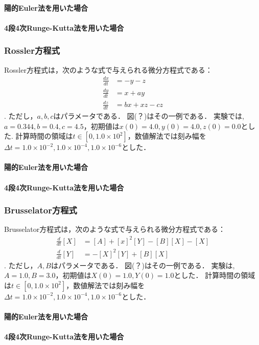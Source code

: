 \paragraph*{陽的Euler法を用いた場合}

\paragraph*{4段4次Runge-Kutta法を用いた場合}

\subsubsection{Rossler方程式}
Rossler方程式は，次のような式で与えられる微分方程式である：
\begin{align}
    \frac{dx}{dt} &= -y-z \\
    \frac{dy}{dt} &= x+ay \\
    \frac{dz}{dt} &= bx + xz - cz
\end{align}.
ただし，$a,b,c$はパラメータである．
図(？)はその一例である．
実験では,$a=0.344, b=0.4, c=4.5$，初期値は$x(0) = 4.0, y(0) = 4.0, z(0) = 0.0$とした.
計算時間の領域は$t \in [0,1.0 \times 10^2]$，数値解法では刻み幅を$\Delta t =  1.0 \times 10^{-2},1.0 \times 10^{-4}, 1.0 \times 10^{-6}$とした．
\paragraph*{陽的Euler法を用いた場合}

\paragraph*{4段4次Runge-Kutta法を用いた場合}

\subsubsection{Brusselator方程式}
Brusselator方程式は，次のような式で与えられる微分方程式である：
\begin{align}
    \frac{d}{dt}[X] &= [A] + [x]^2[Y] - [B][X] - [X]\\
    \frac{d}{dt}[Y] &= -[X]^2[Y] + [B][X]
\end{align}.
ただし，$A,B$はパラメータである．
図(？)はその一例である．
実験は,$A=1.0, B=3.0$，初期値は$X(0) = 1.0, Y(0) = 1.0$とした．
計算時間の領域は$t \in [0,1.0 \times 10^2]$，数値解法では刻み幅を$\Delta t =  1.0 \times 10^{-2},1.0 \times 10^{-4}, 1.0 \times 10^{-6}$とした．
\paragraph*{陽的Euler法を用いた場合}

\paragraph*{4段4次Runge-Kutta法を用いた場合}


